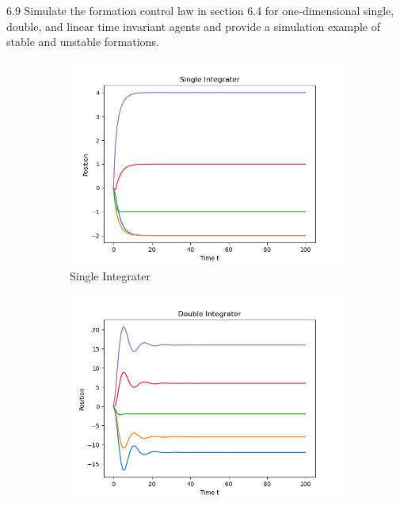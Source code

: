 \documentclass{article}
\begin{document}
\begin{problem} 6.9
    Simulate the formation control law in section 6.4 for one-dimensional
    single, double, and linear time invariant agents and provide a simulation example of stable and unstable formations.

    \begin{figure}[!h]
        \centering
        \begin{subfigure}{0.4\textwidth}
            \includegraphics[width=\textwidth]{./img/p5_1.png}
            \caption{Single Integrater}
        \end{subfigure}
        \begin{subfigure}{0.4\textwidth}
            \includegraphics[width=\textwidth]{./img/p5_2.png}

\end{subfigure}
\end{figure}
\end{problem}
\end{document}
